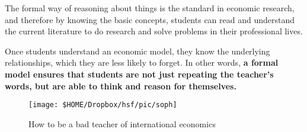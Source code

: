 \begin{itemize}
{		\item The formal way of reasoning about things is the standard in economic research, and therefore by knowing the basic concepts, students can read and understand the current literature to do research and solve problems in their professional lives.
		\item Once students understand an economic model, they know the underlying relationships, which they are less likely to forget. In other words, \textbf{a formal model ensures that students are not just repeating the teacher's words, but are able to think and reason for themselves.}
	}
	\end{itemize}	
	
	\begin{figure}[H]
	\begin{center}
		
		\texttt{[image: \$HOME/Dropbox/hsf/pic/soph]}
		\caption{How to be a bad teacher of international economics}
		\label{fig:bozos} 
		
	\end{center}
	\end{figure}
	
